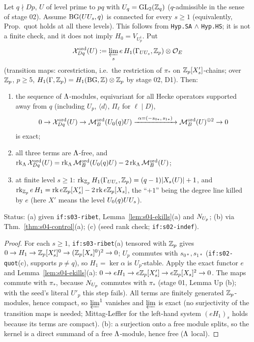 \begin{theorem}\label{thm:s04-lambdaribet}
Let $q\nmid Dp$, $U$ of level prime to $pq$ with $U_q=\mathrm{GL}_2(\mathbb{Z}_q)$ ($q$-admissible in the sense of stage 02). Assume $\mathrm{BG}(UU_s,q)$ is connected for every $s\ge1$
(equivalently, Prop.~quot holds at all these levels). This follows from \texttt{Hyp.SA} $\wedge$ \texttt{Hyp.HS}; it is not a finite check, and it does not imply $H_0=V_{U_p^1}$.
Put
\[\mathcal{X}^{\mathrm{ord}}_{Dq}(U):=\varprojlim_se\,H_1(\Gamma_{UU_s},\mathbb{Z}_p)\otimes\mathcal{O}_E\]
(transition maps: corestriction, i.e.\ the restriction of $\pi_*$ on $\mathbb{Z}_p[X'_s]$-chains; over $\mathbb{Z}_p$, $p\ge5$, $H_1(\Gamma,\mathbb{Z}_p)=H_1(\mathrm{BG},\mathbb{Z})\otimes\mathbb{Z}_p$
by stage 02, D1). Then:
\begin{enumerate}[label=(\alph*)]
\item the sequence of $\Lambda$-modules, equivariant for all Hecke operators supported away from $q$ (including $U_p$, $\langle d\rangle$,
  $\Pi_\ell$ for $\ell\mid D$),
  \[0\to\Xord_{Dq}(U)\to\Mord(\Uzero{q}U)\xrightarrow{\ \alpha=(-s_{0*},\,s_{1*})\ }\Mord(U)^{\oplus2}\to0\]
  is exact;
\item all three terms are $\Lambda$-free, and $\operatorname{rk}_\Lambda\mathcal{X}^{\mathrm{ord}}_{Dq}(U)=\operatorname{rk}_\Lambda\mathcal{M}^{\mathrm{ord}}_B(U_0(q)U)-2\operatorname{rk}_\Lambda\mathcal{M}^{\mathrm{ord}}_B(U)$;
\item at finite level $s\ge1$: $\operatorname{rk}_{\mathbb{Z}_p}H_1(\Gamma_{UU_s},\mathbb{Z}_p)=(q-1)|X_s(U)|+1$, and $\operatorname{rk}_{\mathbb{Z}_p}e\,H_1=\operatorname{rk} e\mathbb{Z}_p[X'_{s}]-2\operatorname{rk} e\mathbb{Z}_p[X_s]$,
  the ``$+1$'' being the degree line killed by $e$ (here $X'$ means the level $U_0(q)UU_s$).
\end{enumerate}
Status: (a) \stproved{} given \texttt{if:s03-ribet}, Lemma~\ref{lem:s04-ekills}(a) and $N_{U_p}$; (b) \stpmc{} via
Thm.~\ref{thm:s04-control}(a); (c) \stproved{} (seed rank check; \texttt{if:s02-indef}).
\end{theorem}
\begin{proof}
For each $s\ge1$, \texttt{if:s03-ribet}(a) tensored with $\mathbb{Z}_p$ gives $0\to H_1\to\mathbb{Z}_p[X'_s]^0\to(\mathbb{Z}_p[X_s]^0)^2\to0$; $U_p$ commutes
with $s_{0*},s_{1*}$ (\texttt{if:s02-quot}(c), supports $p\ne q$), so $H_1=\ker\alpha$ is $U_p$-stable. Apply the exact functor $e$
and Lemma~\ref{lem:s04-ekills}(a): $0\to eH_1\to e\mathbb{Z}_p[X'_s]\to e\mathbb{Z}_p[X_s]^2\to0$. The maps commute with $\pi_*$, because
$N_{U_p}$ commutes with $\pi_*$ (stage 01, Lemma Up (b); with the seed's literal $U'_p$ this step fails). All terms are finitely
generated $\mathbb{Z}_p$-modules, hence compact, so $\varprojlim^1$ vanishes and $\varprojlim$ is exact (no surjectivity of the transition maps
is needed; Mittag-Leffler for the left-hand system $(eH_1)_s$ holds because its terms are compact). (b): a surjection onto a free module splits, so the kernel is a
direct summand of a free $\Lambda$-module, hence free ($\Lambda$ local).
\end{proof}

